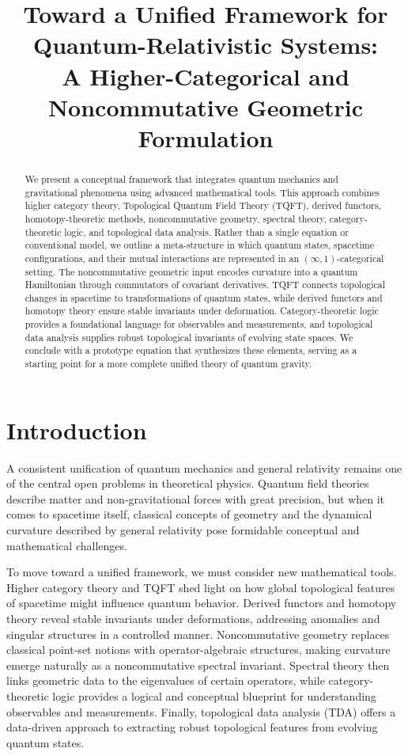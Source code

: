 \documentclass[12pt]{article}
\title{Toward a Unified Framework for Quantum-Relativistic Systems:\\A Higher-Categorical and Noncommutative Geometric Formulation}
\author{ }
\date{}
\begin{document}
\maketitle

\begin{abstract}
We present a conceptual framework that integrates quantum mechanics and gravitational phenomena using advanced mathematical tools. This approach combines higher category theory, Topological Quantum Field Theory (TQFT), derived functors, homotopy-theoretic methods, noncommutative geometry, spectral theory, category-theoretic logic, and topological data analysis. Rather than a single equation or conventional model, we outline a meta-structure in which quantum states, spacetime configurations, and their mutual interactions are represented in an $(\infty,1)$-categorical setting. The noncommutative geometric input encodes curvature into a quantum Hamiltonian through commutators of covariant derivatives. TQFT connects topological changes in spacetime to transformations of quantum states, while derived functors and homotopy theory ensure stable invariants under deformation. Category-theoretic logic provides a foundational language for observables and measurements, and topological data analysis supplies robust topological invariants of evolving state spaces. We conclude with a prototype equation that synthesizes these elements, serving as a starting point for a more complete unified theory of quantum gravity.
\end{abstract}

\section{Introduction}
A consistent unification of quantum mechanics and general relativity remains one of the central open problems in theoretical physics. Quantum field theories describe matter and non-gravitational forces with great precision, but when it comes to spacetime itself, classical concepts of geometry and the dynamical curvature described by general relativity pose formidable conceptual and mathematical challenges.

To move toward a unified framework, we must consider new mathematical tools. Higher category theory and TQFT shed light on how global topological features of spacetime might influence quantum behavior. Derived functors and homotopy theory reveal stable invariants under deformations, addressing anomalies and singular structures in a controlled manner. Noncommutative geometry replaces classical point-set notions with operator-algebraic structures, making curvature emerge naturally as a noncommutative spectral invariant. Spectral theory then links geometric data to the eigenvalues of certain operators, while category-theoretic logic provides a logical and conceptual blueprint for understanding observables and measurements. Finally, topological data analysis (TDA) offers a data-driven approach to extracting robust topological features from evolving quantum states.
\end{document}
